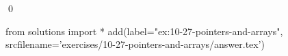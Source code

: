 
\begin{ex}
  \label{ex:10-27-pointers-and-arrays}
  
  \qed
\end{ex}
\begin{python0}
from solutions import *
add(label="ex:10-27-pointers-and-arrays",
    srcfilename='exercises/10-27-pointers-and-arrays/answer.tex')
\end{python0}
